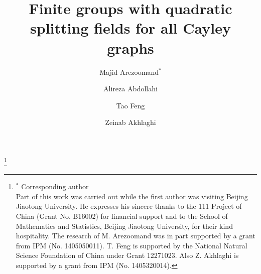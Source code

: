 \documentclass{amsart}
\begin{document}
\title{Finite groups with quadratic splitting fields for all Cayley graphs}
	\author[M. Arezoomand]{Majid Arezoomand$^*$}
\author[A. Abdollahi]{Alireza Abdollahi}
\author[T. Feng]{Tao Feng}
	
	
	\address{Majid Arezoomand, Department of Mathematics, Faculty of Sciences, Shahid Rajaee Teacher Training University, Tehran 16785-163, Irann\newline
		and \newline
		School of Mathematics,\newline
		Institute for Research in Fundamental Science(IPM)
		P.O. Box:19395-5746, Tehran, Iran.}
\address{Alireza Abdollahi, Department of Pure Mathematics, Faculty of Mathematics and Statistics,\newline
		 University of Isfahan, Isfahan 81746-73441, Iran}

\address{Tao Feng, School of Mathematics and Statistics, Beijing Jiaotong University, Beijing 100044, PR China}

\author[Z. Akhlaghi]{Zeinab Akhlaghi}
		\address{Zeinab Akhlaghi, Faculty of Math. and Computer Sci., \newline Amirkabir University of Technology (Tehran Polytechnic), 15914 Tehran, Iran.\newline
		and \newline
		School of Mathematics,\newline
		Institute for Research in Fundamental Science(IPM)
		P.O. Box:19395-5746, Tehran, Iran.}

\thanks{$^*$ Corresponding author\\
	Part of this work was carried out while the first author was visiting Beijing Jiaotong University. He expresses his sincere thanks to the 111 Project of China (Grant No. B16002) for financial support and to the School of Mathematics and Statistics, Beijing Jiaotong University, for their kind hospitality. The research of M. Arezoomand was in part supported by a grant from IPM (No. 1405050011). T. Feng is supported by the National Natural Science Foundation of China under Grant 12271023.  Also Z. Akhlaghi is  supported by a  grant from IPM (No. 1405320014).}


 
\end{document}
